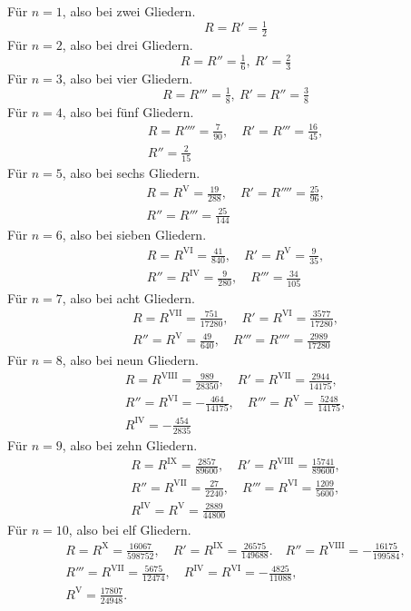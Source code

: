 Für $n=1$, also bei zwei Gliedern.
\[
R=R'=\tfrac12
\]
Für $n=2$, also bei drei Gliedern.
\[
R=R''=\tfrac16,\ R'=\tfrac23
\]
Für $n=3$, also bei vier Gliedern.
\[
R=R'''=\tfrac18,\ R'=R''=\tfrac38
\]
Für $n=4$, also bei fünf Gliedern.
\[
\begin{gathered}
R=R''''=\tfrac7{90},\quad R'=R'''=\tfrac{16}{45},\\[5pt]
R''=\tfrac2{15}
\end{gathered}
\]
Für $n=5$, also bei sechs Gliedern.
\[
\begin{gathered}
R=R^{\mathrm{V}}=\tfrac{19}{288},\quad R'=R''''=\tfrac{25}{96},\\[5pt]
R''=R'''=\tfrac{25}{144}
\end{gathered}
\]
Für $n=6$, also bei sieben Gliedern.
\[
\begin{gathered}
R=R^{\mathrm{VI}}=\tfrac{41}{840},\quad R'=R^{\mathrm{V}}=\tfrac9{35},\\[5pt]
R''=R^{\mathrm{IV}}=\tfrac9{280},\quad R'''=\tfrac{34}{105}
\end{gathered}
\]
Für $n=7$, also bei acht Gliedern.
\[
\begin{gathered}
R=R^{\mathrm{VII}}=\tfrac{751}{17280},\quad R'=R^{\mathrm{VI}}=\tfrac{3577}{17280},\\[5pt]
R''=R^{\mathrm{V}}=\tfrac{49}{640},\quad R'''=R''''=\tfrac{2989}{17280}
\end{gathered}
\]
Für $n=8$, also bei neun Gliedern.
\[
\begin{gathered}
R=R^{\mathrm{VIII}}=\tfrac{989}{28350},\quad R'=R^{\mathrm{VII}}=\tfrac{2944}{14175},\\[5pt]
R''=R^{\mathrm{VI}}=-\tfrac{464}{14175},\quad R'''=R^{\mathrm{V}}=\tfrac{5248}{14175},\\[5pt]
R^{\mathrm{IV}}=-\tfrac{454}{2835}
\end{gathered}
\]
Für $n=9$, also bei zehn Gliedern.
\[
\begin{gathered}
R=R^{\mathrm{IX}}=\frac{2857}{89600},\quad R'=R^{\mathrm{VIII}}=\frac{15741}{89600},\\[5pt]
R''=R^{\mathrm{VII}}=\frac{27}{2240},\quad R'''=R^{\mathrm{VI}}=\frac{1209}{5600},\\[5pt]
R^{\mathrm{IV}}=R^{\mathrm{V}}=\frac{2889}{44800}
\end{gathered}
\]
Für $n=10$, also bei elf Gliedern.
\[
\begin{gathered}
R=R^{\mathrm{X}}=\frac{16067}{598752},\quad R'=R^{\mathrm{IX}}=\frac{26575}{149688}.\quad
R''=R^{\mathrm{VIII}}=-\frac{16175}{199584},\\[5pt]
R'''=R^{\mathrm{VII}}=\frac{5675}{12474},\quad R^{\mathrm{IV}}=R^{\mathrm{VI}}=-\frac{4825}{11088},\\[5pt]
R^{\mathrm{V}}=\frac{17807}{24948}.
\end{gathered}
\]

